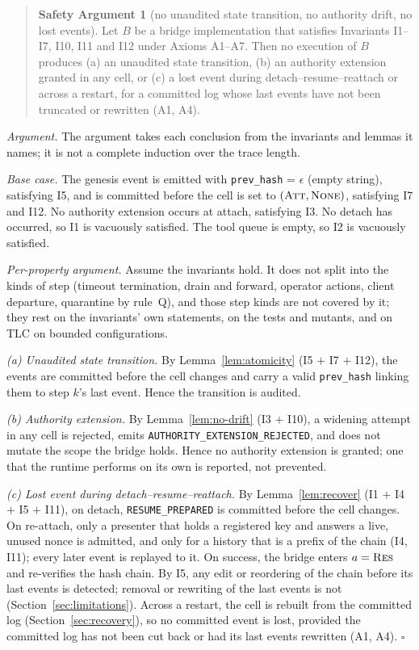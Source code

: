\begin{quote}
\textbf{Safety Argument 1} (no unaudited state transition, no
authority drift, no lost events). Let $B$ be a bridge implementation
that satisfies Invariants I1--I7, I10, I11 and I12 under Axioms A1--A7. Then
no execution of $B$ produces (a) an unaudited state transition,
(b) an authority extension granted in any cell, or (c) a lost event during
detach--resume--reattach or across a restart, for a committed log whose
last events have not been truncated or rewritten (A1, A4).
\end{quote}

\emph{Argument.} The argument takes each conclusion from the invariants
and lemmas it names; it is not a complete induction over the trace length.

\emph{Base case.} The genesis event is emitted with
\texttt{prev\_hash} = $\epsilon$ (empty string), satisfying I5, and is
committed before the cell is set to $(\textsc{Att},\textsc{None})$,
satisfying I7 and I12. No authority extension occurs at attach, satisfying
I3. No detach has occurred, so I1 is vacuously satisfied. The tool queue
is empty, so I2 is vacuously satisfied.

\emph{Per-property argument.} Assume the invariants hold. It does not
split into the kinds of step (timeout termination, drain and forward,
operator actions, client departure, quarantine by rule~Q), and those step
kinds are not covered by it; they rest on the invariants' own statements, on
the tests and mutants, and on TLC on bounded configurations.

\emph{(a) Unaudited state transition.} By Lemma~\ref{lem:atomicity}
(I5 $+$ I7 $+$ I12), the events are committed before the cell changes
and carry a valid \texttt{prev\_hash} linking them to step $k$'s last
event. Hence the transition is audited.

\emph{(b) Authority extension.} By Lemma~\ref{lem:no-drift}
(I3 $+$ I10), a widening attempt in any cell is rejected, emits
\texttt{AUTHORITY\_EXTENSION\_REJECTED}, and does not mutate the scope
the bridge holds. Hence no authority extension is granted; one that the
runtime performs on its own is reported, not prevented.

\emph{(c) Lost event during detach--resume--reattach.} By
Lemma~\ref{lem:recover} (I1 $+$ I4 $+$ I5 $+$ I11), on detach,
\texttt{RESUME\_PREPARED} is committed before the cell changes. On
re-attach, only a presenter that holds a registered key and answers a
live, unused nonce is admitted, and only for a history that is a prefix
of the chain (I4, I11); every later event is replayed to it. On success,
the bridge enters $a=\textsc{Res}$ and re-verifies the hash chain. By I5, any edit or reordering of the chain before its last events is
detected; removal or rewriting of the last events is not (Section~\ref{sec:limitations}). Across a restart, the cell is rebuilt from the committed log
(Section~\ref{sec:recovery}), so no committed event is lost, provided
the committed log has not been cut back or had its last events rewritten
(A1, A4). $\square$

